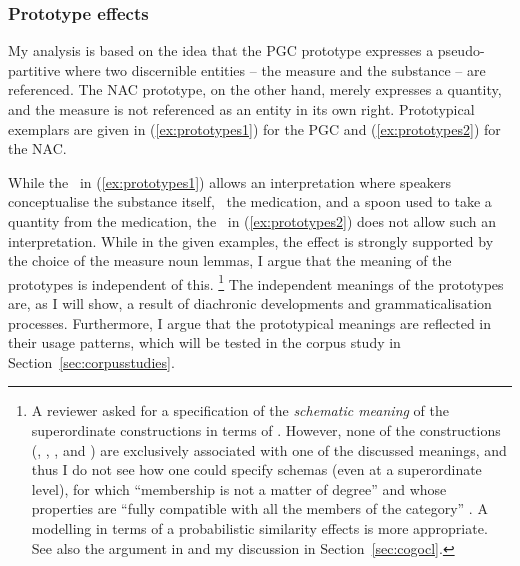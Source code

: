\subsubsection{Prototype effects}
\label{sec:prototypeeffects}

My analysis is based on the idea that the PGC prototype expresses a pseudo-partitive where two discernible entities -- the measure and the substance -- are referenced.
The NAC prototype, on the other hand, merely expresses a quantity, and the measure is not referenced as an entity in its own right.
Prototypical exemplars are given in (\ref{ex:prototypes1}) for the PGC and (\ref{ex:prototypes2}) for the NAC.

\begin{exe}
  \ex\label{ex:prototypes} 
  \begin{xlist}
  \end{xlist}
\end{exe}

While the \PGCd\ in (\ref{ex:prototypes1}) allows an interpretation where speakers conceptualise the substance itself, \ie\ the medication, and a spoon used to take a quantity from the medication, the \NACb\ in (\ref{ex:prototypes2}) does not allow such an interpretation.
While in the given examples, the effect is strongly supported by the choice of the measure noun lemmas, I argue that the meaning of the prototypes is independent of this.%
\footnote{A reviewer asked for a specification of the \textit{schematic meaning} of the superordinate constructions in terms of \citet{Langacker1987}.
However, none of the constructions (\PGCd, \PGCa, \NACb, and \NACa) are exclusively associated with one of the discussed meanings, and thus I do not see how one could specify schemas (even at a superordinate level), for which ``membership is not a matter of degree'' and whose properties are ``fully compatible with all the members of the category'' \citep[371]{Langacker1987}.
A modelling in terms of a probabilistic similarity effects is more appropriate.
See also the argument in \citet[70--71]{Taylor2003} and my discussion in Section~\ref{sec:cogocl}.}
The independent meanings of the prototypes are, as I will show, a result of diachronic developments and grammaticalisation processes.
Furthermore, I argue that the prototypical meanings are reflected in their usage patterns, which will be tested in the corpus study in Section~\ref{sec:corpusstudies}.

